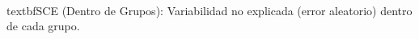 \documentclass[preview]{standalone}
\begin{document}
\begin{center}
\quad\\textbf{SCE (Dentro de Grupos):} Variabilidad no explicada (error aleatorio) dentro de cada grupo.
\end{center}
\end{document}
